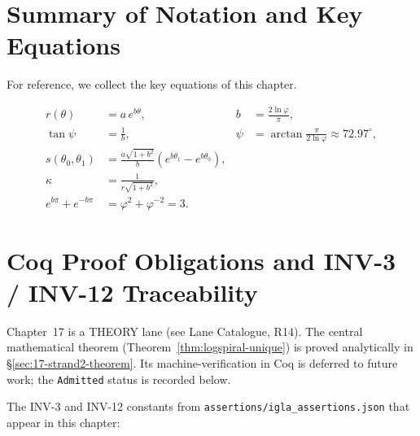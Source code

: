 \section{Summary of Notation and Key Equations}
\label{sec:17-summary}

For reference, we collect the key equations of this chapter.

\begin{definition}
\label{def:summary-golden}
\begin{align}
  r(\theta) &= a\,e^{b\theta}, & b &= \frac{2\ln\varphi}{\pi},
  \tag{Polar equation}\\[2pt]
  \tan\psi &= \frac{1}{b}, &
  \psi &= \arctan\frac{\pi}{2\ln\varphi} \approx 72.97^\circ,
  \tag{Equiangular angle}\\[2pt]
  s(\theta_0,\theta_1) &= \frac{a\sqrt{1+b^2}}{b}(e^{b\theta_1}-e^{b\theta_0}),
  & & \tag{Arclength}\\[2pt]
  \kappa &= \frac{1}{r\sqrt{1+b^2}}, & & \tag{Curvature}\\[2pt]
  e^{b\pi}+e^{-b\pi} &= \varphi^2+\varphi^{-2} = 3. & &
  \tag{Trinity identity}
\end{align}
\end{definition}

\section{Coq Proof Obligations and INV-3 / INV-12 Traceability}
\label{sec:17-coq}

Chapter~17 is a THEORY lane (see Lane Catalogue, R14).
The central mathematical theorem (Theorem~\ref{thm:logspiral-unique})
is proved analytically in \S\ref{sec:17-strand2-theorem}.
Its machine-verification in Coq is deferred to future work;
the \texttt{Admitted} status is recorded below.


\noindent The INV-3 and INV-12 constants from
\texttt{assertions/igla\_assertions.json} that appear in
this chapter:

